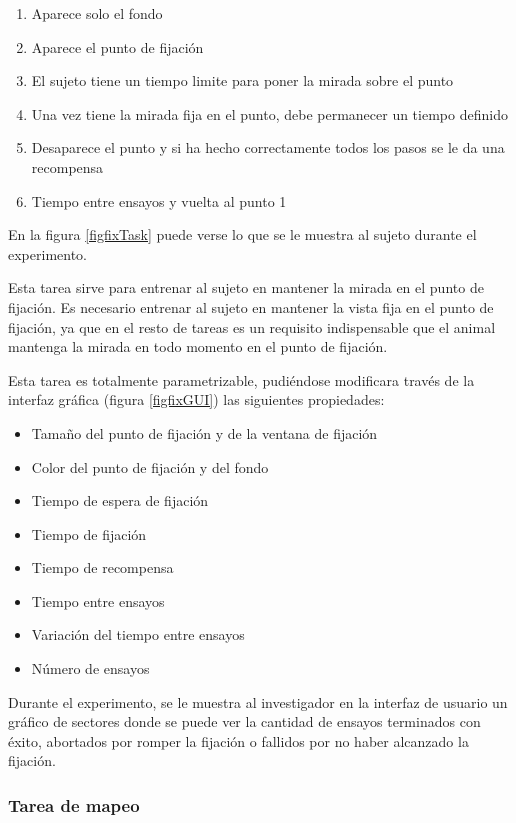 \documentclass[conference]{IEEEtran}
\begin{document}
\begin{enumerate}
	\item Aparece solo el fondo
	\item Aparece el punto de fijación
	\item El sujeto tiene un tiempo limite para poner la mirada sobre el punto
	\item Una vez tiene la mirada fija en el punto, debe permanecer un tiempo definido
	\item Desaparece el punto y si ha hecho correctamente todos los pasos se le da una recompensa
	\item Tiempo entre ensayos y vuelta al punto 1
\end{enumerate}

En la figura \ref{figfixTask} puede verse lo que se le muestra al sujeto durante el experimento. 

Esta tarea sirve para entrenar al sujeto en mantener la mirada en el punto de fijación. Es necesario entrenar al sujeto en mantener la vista fija en el punto de fijación, ya que en el resto de tareas es un requisito indispensable que el animal mantenga la mirada en todo momento en el punto de fijación.

Esta tarea es totalmente parametrizable, pudiéndose modificara través de la interfaz gráfica (figura \ref{figfixGUI}) las siguientes propiedades:
\begin{itemize}
	\item Tamaño del punto de fijación y de la ventana de fijación
	\item Color del punto de fijación y del fondo
	\item Tiempo de espera de fijación
	\item Tiempo de fijación
	\item Tiempo de recompensa
	\item Tiempo entre ensayos
	\item Variación del tiempo entre ensayos
	\item Número de ensayos
\end{itemize}




Durante el experimento, se le muestra al investigador en la interfaz de usuario un gráfico de sectores donde se puede ver la cantidad de ensayos terminados con éxito, abortados por romper la fijación o fallidos por no haber alcanzado la fijación.

\subsubsection*{Tarea de mapeo}
\end{document}
